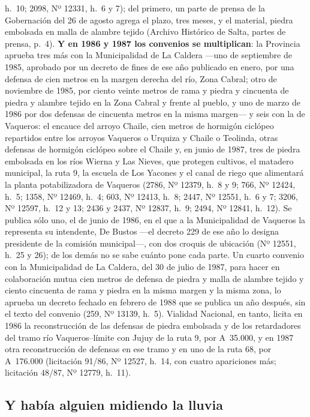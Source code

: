 h.\ 10; 2098, Nº 12331, h.\ 6 y 7); del primero, un parte de prensa de la Gobernación del 26 de agosto agrega el plazo, tres meses, y el material, piedra embolsada en malla de alambre tejido (Archivo Histórico de Salta, partes de prensa, p.~4). \textbf{Y en 1986 y 1987 los convenios se multiplican}: la Provincia aprueba tres más con la Municipalidad de La Caldera ---uno de septiembre de 1985, aprobado por un decreto de fines de ese año publicado en enero, por una defensa de cien metros en la margen derecha del río, Zona Cabral; otro de noviembre de 1985, por ciento veinte metros de rama y piedra y cincuenta de piedra y alambre tejido en la Zona Cabral y frente al pueblo, y uno de marzo de 1986 por dos defensas de cincuenta metros en la misma margen--- y seis con la de Vaqueros: el encauce del arroyo Chaile, cien metros de hormigón ciclópeo repartidos entre los arroyos Vaqueros o Urquiza y Chaile o Teolinda, otras defensas de hormigón ciclópeo sobre el Chaile y, en junio de 1987, tres de piedra embolsada en los ríos Wierna y Las Nieves, que protegen cultivos, el matadero municipal, la ruta 9, la escuela de Los Yacones y el canal de riego que alimentará la planta potabilizadora de Vaqueros (2786, Nº 12379, h.\ 8 y 9; 766, Nº 12424, h.\ 5; 1358, Nº 12469, h.\ 4; 603, Nº 12413, h.\ 8; 2447, Nº 12551, h.\ 6 y 7; 3206, Nº 12597, h.\ 12 y 13; 2436 y 2437, Nº 12837, h.\ 9; 2494, Nº 12841, h.\ 12). Se publica sólo uno, el de junio de 1986, en el que a la Municipalidad de Vaqueros la representa su intendente, De Bustos ---el decreto 229 de ese año lo designa presidente de la comisión municipal---, con dos croquis de ubicación (Nº 12551, h.\ 25 y 26); de los demás no se sabe cuánto pone cada parte. Un cuarto convenio con la Municipalidad de La Caldera, del 30 de julio de 1987, para hacer en colaboración mutua cien metros de defensa de piedra y malla de alambre tejido y ciento cincuenta de rama y piedra en la misma margen y la misma zona, lo aprueba un decreto fechado en febrero de 1988 que se publica un año después, sin el texto del convenio (259, Nº 13139, h.\ 5). Vialidad Nacional, en tanto, licita en 1986 la reconstrucción de las defensas de piedra embolsada y de los retardadores del tramo río Vaqueros--límite con Jujuy de la ruta 9, por A~35.000, y en 1987 otra reconstrucción de defensas en ese tramo y en uno de la ruta 68, por A~176.000 (licitación 91/86, Nº 12527, h.\ 14, con cuatro apariciones más; licitación 48/87, Nº 12779, h.\ 11).

\subsection*{Y había alguien midiendo la lluvia}

